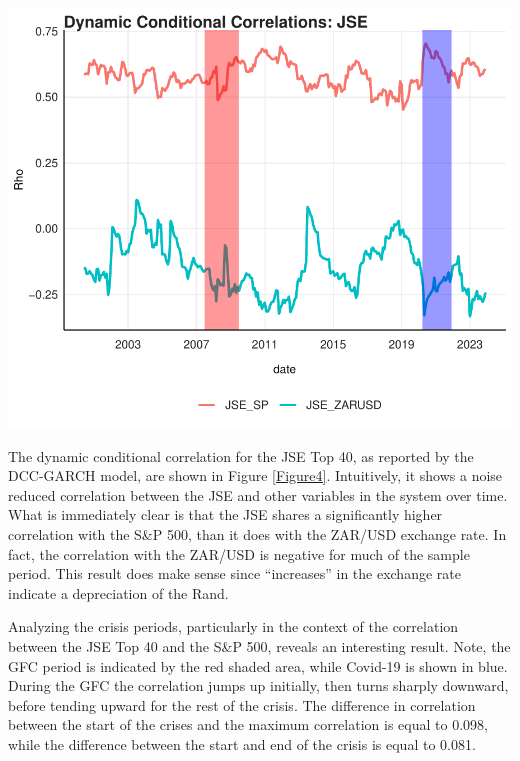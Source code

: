\documentclass[11pt,preprint, authoryear]{elsarticle}
\let\origfigure\figure
\let\endorigfigure\endfigure
\renewenvironment{figure}[1][2] {
    \expandafter\origfigure\expandafter[H]
} {
    \endorigfigure
}
\numberwithin{equation}{section}
\numberwithin{figure}{section}
\numberwithin{table}{section}
\begin{document}
\begin{figure}[H]

{\centering \includegraphics{Template_files/figure-latex/Figure4-1} 

}

\caption{DCC GARCH \label{Figure4}}\label{fig:Figure4}
\end{figure}

The dynamic conditional correlation for the JSE Top 40, as reported by
the DCC-GARCH model, are shown in Figure \ref{Figure4}. Intuitively, it
shows a noise reduced correlation between the JSE and other variables in
the system over time. What is immediately clear is that the JSE shares a
significantly higher correlation with the S\&P 500, than it does with
the ZAR/USD exchange rate. In fact, the correlation with the ZAR/USD is
negative for much of the sample period. This result does make sense
since ``increases'' in the exchange rate indicate a depreciation of the
Rand.

Analyzing the crisis periods, particularly in the context of the
correlation between the JSE Top 40 and the S\&P 500, reveals an
interesting result. Note, the GFC period is indicated by the red shaded
area, while Covid-19 is shown in blue. During the GFC the correlation
jumps up initially, then turns sharply downward, before tending upward
for the rest of the crisis. The difference in correlation between the
start of the crises and the maximum correlation is equal to 0.098, while
the difference between the start and end of the crisis is equal to
0.081.
\end{document}
